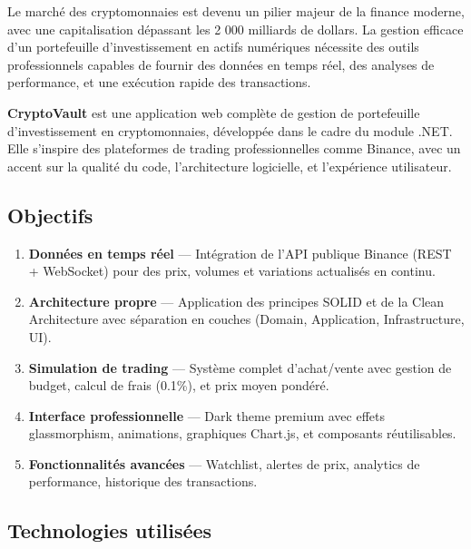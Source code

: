 \documentclass[12pt,a4paper]{article}
\begin{document}
Le marché des cryptomonnaies est devenu un pilier majeur de la finance moderne, avec une capitalisation dépassant les 2 000 milliards de dollars. La gestion efficace d'un portefeuille d'investissement en actifs numériques nécessite des outils professionnels capables de fournir des données en temps réel, des analyses de performance, et une exécution rapide des transactions.

\textbf{CryptoVault} est une application web complète de gestion de portefeuille d'investissement en cryptomonnaies, développée dans le cadre du module .NET. Elle s'inspire des plateformes de trading professionnelles comme Binance, avec un accent sur la qualité du code, l'architecture logicielle, et l'expérience utilisateur.

\subsection{Objectifs}

\begin{enumerate}[leftmargin=2cm]
    \item \textbf{Données en temps réel} --- Intégration de l'API publique Binance (REST + WebSocket) pour des prix, volumes et variations actualisés en continu.
    \item \textbf{Architecture propre} --- Application des principes SOLID et de la Clean Architecture avec séparation en couches (Domain, Application, Infrastructure, UI).
    \item \textbf{Simulation de trading} --- Système complet d'achat/vente avec gestion de budget, calcul de frais (0.1\%), et prix moyen pondéré.
    \item \textbf{Interface professionnelle} --- Dark theme premium avec effets glassmorphism, animations, graphiques Chart.js, et composants réutilisables.
    \item \textbf{Fonctionnalités avancées} --- Watchlist, alertes de prix, analytics de performance, historique des transactions.
\end{enumerate}

\subsection{Technologies utilisées}
\end{document}
